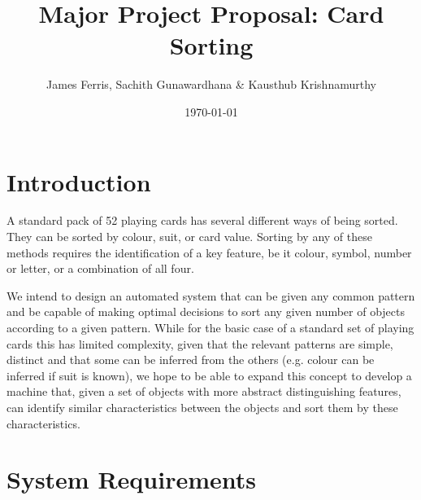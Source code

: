\documentclass[dvips,12pt]{article}
\begin{document}

\title{Major Project Proposal: Card Sorting}
\author{James Ferris, Sachith Gunawardhana \& Kausthub Krishnamurthy}
\date{\today}



\maketitle


\section{Introduction}


A standard pack of 52 playing cards has several different ways of being sorted. They can be sorted by colour, suit, or card value. Sorting by any of these methods requires the identification of a key feature, be it colour, symbol, number or letter, or a combination of all four.\newline

We intend to design an automated system that can be given any common pattern and be capable of making optimal decisions to sort any given number of objects according to a given pattern. While for the basic case of a standard set of playing cards this has limited complexity, given that the relevant patterns are simple, distinct and that some can be inferred from the others (e.g. colour can be inferred if suit is known), we hope to be able to expand this concept to develop a machine that, given a set of objects with more abstract distinguishing features, can identify similar characteristics between the objects and sort them by these characteristics. 

\section{System Requirements}
\end{document}
